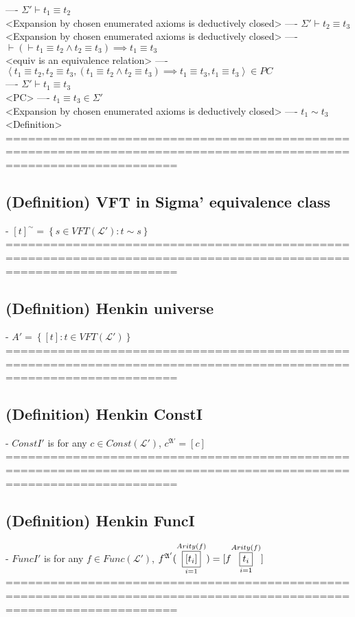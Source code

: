 \documentclass{book}
\newcommand{\means}[2]{#1^{#2}}
\newcommand{\set}[1]{\left\{ #1 \right\}}
\newcommand{\seq}[1]{\left\langle #1 \right\rangle}
\newcommand{\vdc}[3]{\underset{#2}{\overset{#3}{\fbox{$#1$}}}}
\begin{document}
				---- $\Sigma' \vdash t_1 \equiv t_2$ \\ <Expansion by chosen enumerated axioms is deductively closed>
				---- $\Sigma' \vdash t_2 \equiv t_3$ \\ <Expansion by chosen enumerated axioms is deductively closed>
				---- $\vdash (\vdash t_1 \equiv t_2 \land t_2 \equiv t_3) \implies t_1 \equiv t_3$ \\ <equiv is an equivalence relation>
				---- $\seq{t_1 \equiv t_2, t_2 \equiv t_3, (t_1 \equiv t_2 \land t_2 \equiv t_3) \implies t_1 \equiv t_3, t_1 \equiv t_3} \in PC$ \\
				---- $\Sigma' \vdash t_1 \equiv t_3$ \\ <PC>
				---- $t_1 \equiv t_3 \in \Sigma'$ \\ <Expansion by chosen enumerated axioms is deductively closed>
				---- $t_1 \sim t_3$ \\ <Definition>
	===================================================================================================================
\subsection{(Definition) VFT in Sigma' equivalence class}
	- $[t]^\sim = \set{s \in VFT(\mathcal{L}'): t \sim s}$ \\
	===================================================================================================================
\subsection{(Definition) Henkin universe}
	- $A' = \set{[t]: t \in VFT(\mathcal{L}')} $ \\
	===================================================================================================================
\subsection{(Definition) Henkin ConstI}
	- $ConstI'$ is for any $c \in Const(\mathcal{L}')$, $\means{c}{\mathfrak{A}'} = [c]$ \\
	===================================================================================================================
\subsection{(Definition) Henkin FuncI}
	- $FuncI'$ is for any $f \in Func(\mathcal{L}')$, $\means{f}{\mathfrak{A}'}(\vdc{[t_i]}{i=1}{Arity(f)}) = [f \vdc{t_i}{i=1}{Arity(f)}]$ \\
	===================================================================================================================
\end{document}
